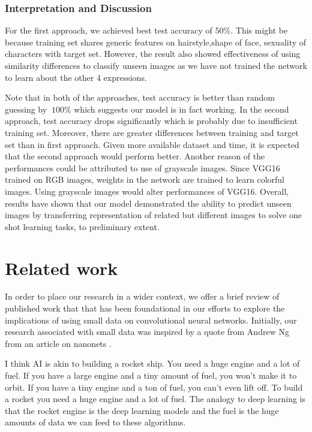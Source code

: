 \documentclass{article}
\begin{document}
\subsubsection{\textbf{Interpretation and Discussion}}

For the first approach, we achieved best test accuracy of $50\%$. This might be because training set shares generic features on hairstyle,shape of face, sexuality of characters with target set. However, the result also showed effectiveness of using similarity differences to classify unseen images as we have not trained the network to learn about the other 4 expressions.

Note that in both of the approaches, test accuracy is better than random guessing by $~100\%$ which suggests our model is in fact working. In the second approach, test accuracy drops significantly which is probably due to insufficient training set. Moreover, there are greater differences between training and target set than in first approach. Given more available dataset and time, it is expected that the second approach would perform better. Another reason of the performances could be attributed to use of grayscale images. Since VGG16 trained on RGB images, weights in the network are trained to learn colorful images. Using grayscale images would alter performances of VGG16. Overall, results have shown that our model demonstrated the ability to predict unseen images by transferring representation of related but different images to solve one shot learning tasks, to preliminary extent. 

\section{Related work}
\label{sec:related}

In order to place our research in a wider context, we offer a brief review of published work that that has been foundational in our efforts to explore the implications of using small data on convolutional neural networks. Initially, our research associated with small data was inspired by a quote from Andrew Ng from an article on nanonets \cite{nanoNets}.

\begin{displayquote}
I think AI is akin to building a rocket ship. You need a huge engine and a lot of fuel. If you have a large engine and a tiny amount of fuel, you won’t make it to orbit. If you have a tiny engine and a ton of fuel, you can’t even lift off. To build a rocket you need a huge engine and a lot of fuel. The analogy to deep learning is that the rocket engine is the deep learning models and the fuel is the huge amounts of data we can feed to these algorithms.
\end{displayquote}
\end{document}

